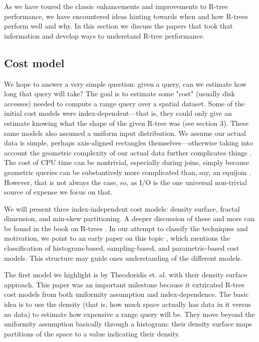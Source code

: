 As we have toured the classic enhancements and improvements to R-tree performance, we have encountered ideas hinting towards when and how R-trees perform well and why.
In this section we discuss the papers that took that information and develop ways to understand R-tree performance.

\subsection{Cost model}
We hope to answer a very simple question: given a query, can we estimate how long that query will take?
The goal is to estimate some "cost" (usually disk accesses) needed to compute a range query over a spatial dataset.
Some of the initial cost models were index-dependent---that is, they could only give an estimate knowing what the shape of the given R-tree was \cite{theodoridisstefanakissellis00} (see section 3).
These same models also assumed a uniform input distribution.
We assume our actual data is simple, perhaps axis-aligned rectangles themselves---otherwise taking into account the geometric complexity of our actual data further complicates things \cite{aboulnaganaughton00}.
The cost of CPU time can be nontrivial, especially during joins, simply because geometric queries can be substantively more complicated than, say, an equijoin \cite{theodoridisstefanakissellis00}.
However, that is not always the case, so, as I/O is the one universal non-trivial source of expense we focus on that.

We will present three index-independent cost models: density surface, fractal dimension, and min-skew partitioning.
A deeper discussion of these and more can be found in the book on R-trees \cite{thebook}.
In our attempt to classify the techniques and motivation, we point to an early paper on this topic \cite{acharyapoosalaramaswamy99}, which mentions the classification of histogram-based, sampling-based, and parametric-based cost models. This structure may guide ones understanding of the different models.

The first model we highlight is by Theodoridis et. al. \cite{theodoridissellis96,theodoridisstefanakissellis00} with their density surface approach.
This paper was an important milestone because it extricated R-tree cost models from both uniformity assumption and index-dependence.
The basic idea is to use the density (that is, how much space actually has data in it versus no data) to estimate how expensive a range query will be.
They move beyond the uniformity assumption basically through a histogram: their density surface maps partitions of the space to a value indicating their density.

